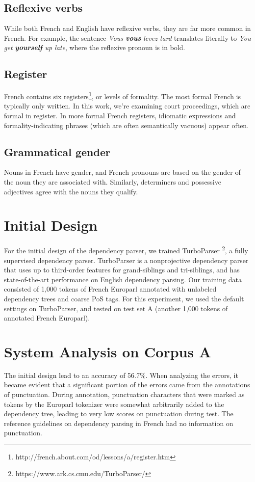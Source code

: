 \documentclass[11pt,letterpaper]{article}
\begin{document}
\subsection{Reflexive verbs}
While both French and English have reflexive verbs, they are far more common in French. For example, the sentence \textit{Vous \textbf{vous} levez tard} translates literally to \textit{You get \textbf{yourself} up late}, where the reflexive pronoun is in bold.
\subsection{Register}
French contains six registers\footnote{http://french.about.com/od/lessons/a/register.htm}, or levels of formality. The most formal French is typically only written. In this work, we're examining court proceedings, which are formal in register. In more formal French registers, idiomatic expressions and formality-indicating phrases (which are often semantically vacuous) appear often.
\subsection{Grammatical gender}
Nouns in French have gender, and French pronouns are based on the gender of the noun they are associated with. Similarly, determiners and possessive adjectives agree with the nouns they qualify. 

\section{Initial Design}
For the initial design of the dependency parser, we trained TurboParser \footnote{https://www.ark.cs.cmu.edu/TurboParser/}, a fully supervised dependency parser. TurboParser is a nonprojective dependency parser that uses up to third-order features for grand-siblings and tri-siblings, and has state-of-the-art performance on English dependency parsing. Our training data consisted of 1,000 tokens of French Europarl annotated with unlabeled dependency trees and coarse PoS tags. For this experiment, we used the default settings on TurboParser, and tested on test set A (another 1,000 tokens of annotated French Europarl). 

\section{System Analysis on Corpus A}
The initial design lead to an accuracy of 56.7\%. When analyzing the errors, it became evident that a significant portion of the errors came from the annotations of punctuation. During annotation, punctuation characters that were marked as tokens by the Europarl tokenizer were somewhat arbitrarily added to the dependency tree, leading to very low scores on punctuation during test. The reference guidelines on dependency parsing in French had no information on punctuation. \\ 
\end{document}
